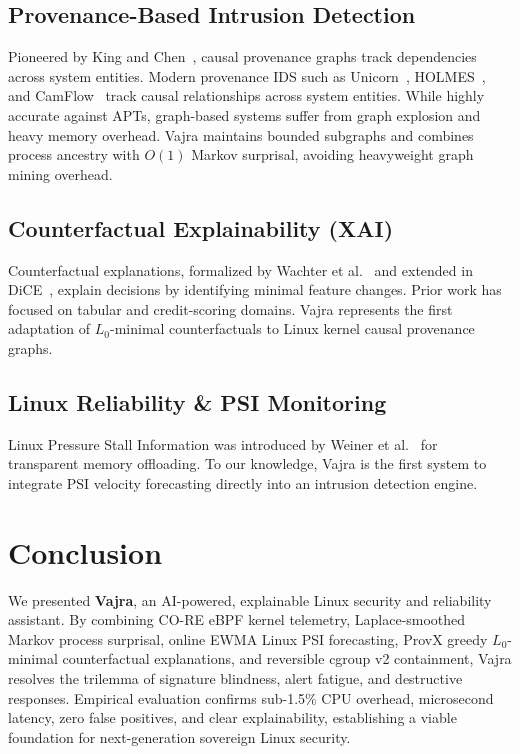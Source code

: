 \documentclass[conference]{IEEEtran}
\begin{document}
\subsection{Provenance-Based Intrusion Detection}
Pioneered by King and Chen~\cite{king2003backtracking}, causal provenance graphs track dependencies across system entities. Modern provenance IDS such as Unicorn~\cite{han2020unicorn}, HOLMES~\cite{milajerdi2019holmes}, and CamFlow~\cite{pasquier2017camflow} track causal relationships across system entities. While highly accurate against APTs, graph-based systems suffer from graph explosion and heavy memory overhead. Vajra maintains bounded subgraphs and combines process ancestry with $O(1)$ Markov surprisal, avoiding heavyweight graph mining overhead.

\subsection{Counterfactual Explainability (XAI)}
Counterfactual explanations, formalized by Wachter et al.~\cite{wachter2017counterfactual} and extended in DiCE~\cite{mothilal2020dice}, explain decisions by identifying minimal feature changes. Prior work has focused on tabular and credit-scoring domains. Vajra represents the first adaptation of $L_0$-minimal counterfactuals to Linux kernel causal provenance graphs.

\subsection{Linux Reliability \& PSI Monitoring}
Linux Pressure Stall Information was introduced by Weiner et al.~\cite{weiner2020psi} for transparent memory offloading. To our knowledge, Vajra is the first system to integrate PSI velocity forecasting directly into an intrusion detection engine.

\section{Conclusion}
\label{sec:conclusion}
We presented \textbf{Vajra}, an AI-powered, explainable Linux security and reliability assistant. By combining CO-RE eBPF kernel telemetry, Laplace-smoothed Markov process surprisal, online EWMA Linux PSI forecasting, ProvX greedy $L_0$-minimal counterfactual explanations, and reversible cgroup v2 containment, Vajra resolves the trilemma of signature blindness, alert fatigue, and destructive responses. Empirical evaluation confirms sub-1.5\% CPU overhead, microsecond latency, zero false positives, and clear explainability, establishing a viable foundation for next-generation sovereign Linux security.



\end{document}
